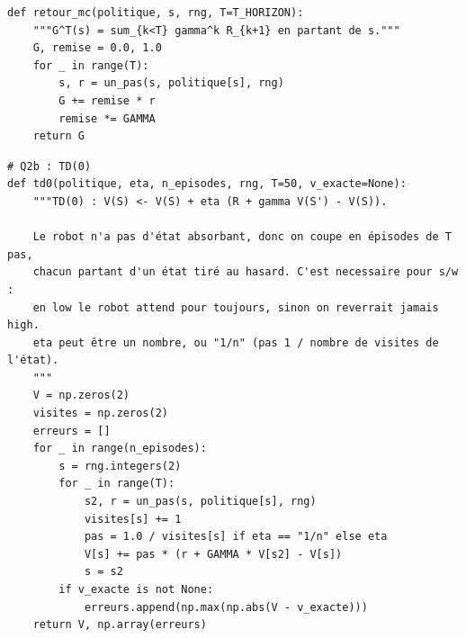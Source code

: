 \documentclass[11pt,a4paper]{article}
\begin{document}
\begin{lstlisting}[firstnumber=116]
def retour_mc(politique, s, rng, T=T_HORIZON):
    """G^T(s) = sum_{k<T} gamma^k R_{k+1} en partant de s."""
    G, remise = 0.0, 1.0
    for _ in range(T):
        s, r = un_pas(s, politique[s], rng)
        G += remise * r
        remise *= GAMMA
    return G
\end{lstlisting}

\begin{lstlisting}[firstnumber=138]
# Q2b : TD(0)
def td0(politique, eta, n_episodes, rng, T=50, v_exacte=None):
    """TD(0) : V(S) <- V(S) + eta (R + gamma V(S') - V(S)).

    Le robot n'a pas d'état absorbant, donc on coupe en épisodes de T pas,
    chacun partant d'un état tiré au hasard. C'est necessaire pour s/w :
    en low le robot attend pour toujours, sinon on reverrait jamais high.
    eta peut être un nombre, ou "1/n" (pas 1 / nombre de visites de l'état).
    """
    V = np.zeros(2)
    visites = np.zeros(2)
    erreurs = []
    for _ in range(n_episodes):
        s = rng.integers(2)
        for _ in range(T):
            s2, r = un_pas(s, politique[s], rng)
            visites[s] += 1
            pas = 1.0 / visites[s] if eta == "1/n" else eta
            V[s] += pas * (r + GAMMA * V[s2] - V[s])
            s = s2
        if v_exacte is not None:
            erreurs.append(np.max(np.abs(V - v_exacte)))
    return V, np.array(erreurs)
\end{lstlisting}
\end{document}

